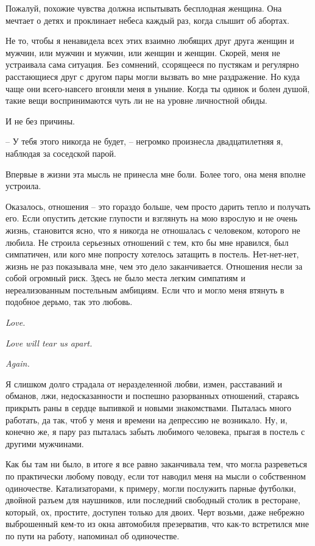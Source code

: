 \documentclass[
]{book}
\begin{document}
Пожалуй, похожие чувства должна испытывать бесплодная женщина. Она мечтает о детях и проклинает небеса каждый раз, когда слышит об абортах.

Не то, чтобы я ненавидела всех этих взаимно любящих друг друга женщин и мужчин, или мужчин и мужчин, или женщин и женщин. Скорей, меня не устраивала сама ситуация. Без сомнений, ссорящееся по пустякам и регулярно расстающиеся друг с другом пары могли вызвать во мне раздражение. Но куда чаще они всего-навсего вгоняли меня в уныние. Когда ты одинок и болен душой, такие вещи воспринимаются чуть ли не на уровне личностной обиды.

И не без причины.

-- У тебя этого никогда не будет, -- негромко произнесла двадцатилетняя я, наблюдая за соседской парой.

Впервые в жизни эта мысль не принесла мне боли. Более того, она меня вполне устроила.

Оказалось, отношения -- это гораздо больше, чем просто дарить тепло и получать его. Если опустить детские глупости и взглянуть на мою взрослую и не очень жизнь, становится ясно, что я никогда не отношалась с человеком, которого не любила. Не строила серьезных отношений с тем, кто бы мне нравился, был симпатичен, или кого мне попросту хотелось затащить в постель. Нет-нет-нет, жизнь не раз показывала мне, чем это дело заканчивается. Отношения несли за собой огромный риск. Здесь не было места легким симпатиям и нереализованным постельным амбициям. Если что и могло меня втянуть в подобное дерьмо, так это любовь.

\emph{Love.}

\emph{Love will tear us apart.}

\emph{Again.}

Я слишком долго страдала от неразделенной любви, измен, расставаний и обманов, лжи, недосказанности и поспешно разорванных отношений, стараясь прикрыть раны в сердце выпивкой и новыми знакомствами. Пыталась много работать, да так, чтоб у меня и времени на депрессию не возникало. Ну, и, конечно же, я пару раз пыталась забыть любимого человека, прыгая в постель с другими мужчинами.

Как бы там ни было, в итоге я все равно заканчивала тем, что могла разреветься по практически любому поводу, если тот наводил меня на мысли о собственном одиночестве. Катализаторами, к примеру, могли послужить парные футболки, двойной разъем для наушников, или последний свободный столик в ресторане, который, ох, простите, доступен только для двоих. Черт возьми, даже небрежно выброшенный кем-то из окна автомобиля презерватив, что как-то встретился мне по пути на работу, напоминал об одиночестве.
\end{document}
